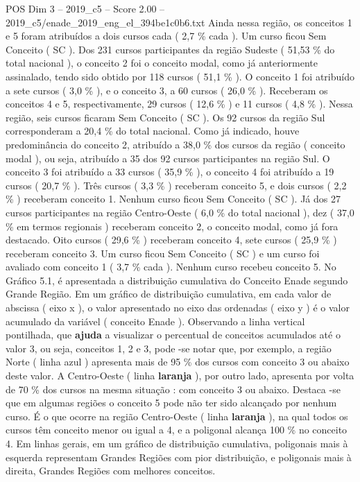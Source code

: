\begin{textsample}{POS Dim 3 – 2019\_c5 – Score 2.00 – 2019\_c5/enade\_2019\_eng\_el\_394be1c0b6.txt}
Ainda nessa região, os conceitos 1 e 5 foram atribuídos a dois cursos cada ( 2,7 \% cada ).
Um curso ficou Sem Conceito ( SC ).
Dos 231 cursos participantes da região Sudeste ( 51,53 \% do total nacional ), o conceito 2 foi o conceito modal, como já anteriormente assinalado, tendo sido obtido por 118 cursos ( 51,1 \% ).
O conceito 1 foi atribuído a sete cursos ( 3,0 \% ), e o conceito 3, a 60 cursos ( 26,0 \% ).
Receberam os conceitos 4 e 5, respectivamente, 29 cursos ( 12,6 \% ) e 11 cursos ( 4,8 \% ).
Nessa região, seis cursos ficaram Sem Conceito ( SC ).
Os 92 cursos da região Sul corresponderam a 20,4 \% do total nacional.
Como já indicado, houve predominância do conceito 2, atribuído a 38,0 \% dos cursos da região ( conceito modal ), ou seja, atribuído a 35 dos 92 cursos participantes na região Sul.
O conceito 3 foi atribuído a 33 cursos ( 35,9 \% ), o conceito 4 foi atribuído a 19 cursos ( 20,7 \% ).
Três cursos ( 3,3 \% ) receberam conceito 5, e dois cursos ( 2,2 \% ) receberam conceito 1.
Nenhum curso ficou Sem Conceito ( SC ).
Já dos 27 cursos participantes na região Centro-Oeste ( 6,0 \% do total nacional ), dez ( 37,0 \% em termos regionais ) receberam conceito 2, o conceito modal, como já fora destacado.
Oito cursos ( 29,6 \% ) receberam conceito 4, sete cursos ( 25,9 \% ) receberam conceito 3.
Um curso ficou Sem Conceito ( SC ) e um curso foi avaliado com conceito 1 ( 3,7 \% cada ).
Nenhum curso recebeu conceito 5.
No Gráfico 5.1, é apresentada a distribuição cumulativa do Conceito Enade segundo Grande Região.
Em um gráfico de distribuição cumulativa, em cada valor de abscissa ( eixo x ), o valor apresentado no eixo das ordenadas ( eixo y ) é o valor acumulado da variável ( conceito Enade ).
Observando a linha vertical pontilhada, que \textbf{ajuda} a visualizar o percentual de conceitos acumulados até o valor 3, ou seja, conceitos 1, 2 e 3, pode -se notar que, por exemplo, a região Norte ( linha azul ) apresenta mais de 95 \% dos cursos com conceito 3 ou abaixo deste valor.
A Centro-Oeste ( linha \textbf{laranja} ), por outro lado, apresenta por volta de 70 \% dos cursos na mesma situação : com conceito 3 ou abaixo.
Destaca -se que em algumas regiões o conceito 5 pode não ter sido alcançado por nenhum curso.
É o que ocorre na região Centro-Oeste ( linha \textbf{laranja} ), na qual todos os cursos têm conceito menor ou igual a 4, e a poligonal alcança 100 \% no conceito 4.
Em linhas gerais, em um gráfico de distribuição cumulativa, poligonais mais à esquerda representam Grandes Regiões com pior distribuição, e poligonais mais à direita, Grandes Regiões com melhores conceitos.

\end{textsample}
